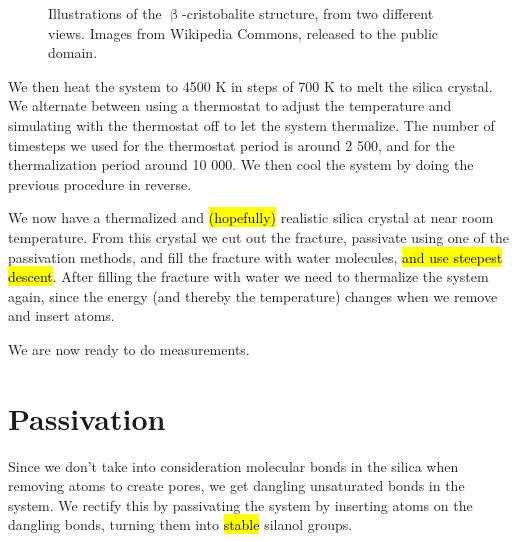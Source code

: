\begin{figure}
    \centering
    \begin{subfigure}[c]{0.25\textwidth}
        
        \caption{}
        \label{fig:cristobalite01}
    \end{subfigure}
    \hspace{0.07\textwidth}
    \begin{subfigure}[c]{0.45\textwidth}
        
    \caption{}
    \label{fig:cristobalite02}
    \end{subfigure}
    \caption{
        Illustrations of the $\upbeta$-cristobalite structure, from two different views. Images from Wikipedia Commons, released to the public domain\cite{wikiCristobalite01,wikiCristobalite02}.
        \label{fig:cristobalite}
    }
\end{figure}

We then heat the system to 4500 K in steps of 700 K to melt the silica crystal. We alternate between using a thermostat to adjust the temperature and simulating with the thermostat off to let the system thermalize. The number of timesteps we used for the thermostat period is around 2 500, and for the thermalization period around 10 000. We then cool the system by doing the previous procedure in reverse.

We now have a thermalized and \hl{(hopefully)} realistic silica crystal at near room temperature. From this crystal we cut out the fracture, passivate using one of the passivation methods, and fill the fracture with water molecules, \hl{and use steepest descent}. After filling the fracture with water we need to thermalize the system again, since the energy (and thereby the temperature) changes when we remove and insert atoms.

We are now ready to do measurements.

\section{Passivation}
Since we don't take into consideration molecular bonds in the silica when removing atoms to create pores, we get dangling unsaturated bonds in the system. We rectify this by passivating the system by inserting atoms on the dangling bonds, turning them into \hl{stable} silanol groups.

